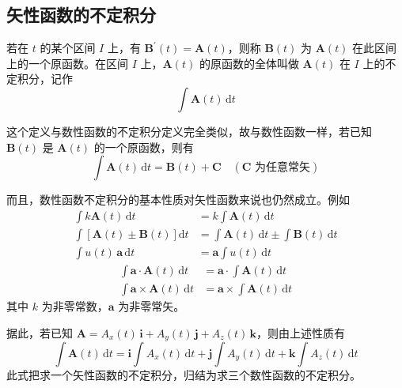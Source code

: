 \subsection{矢性函数的不定积分}

\begin{definition}[矢性函数的不定积分]
	若在 $t$ 的某个区间 $I$ 上，有 $\boldsymbol{B}^{\prime}(t)=\boldsymbol{A}(t)$，则称 $\boldsymbol{B}(t)$ 为 $\boldsymbol{A}(t)$ 在此区间上的一个原函数。在区间 $I$ 上，$\boldsymbol{A}(t)$ 的原函数的全体叫做 $\boldsymbol{A}(t)$ 在 $I$ 上的不定积分，记作
	\begin{equation}
		\label{eq:不定积分:定义}
		\int\boldsymbol{A}(t)\,\mathrm{d}t
	\end{equation}
\end{definition}

这个定义与数性函数的不定积分定义完全类似，故与数性函数一样，若已知 $\boldsymbol{B}(t)$ 是 $\boldsymbol{A}(t)$ 的一个原函数，则有
\begin{equation}
	\label{eq:不定积分:原函数}
	\int\boldsymbol{A}(t)\,\mathrm{d}t=\boldsymbol{B}(t)+\boldsymbol{C}
	\quad(\boldsymbol{C}\text{ 为任意常矢})
\end{equation}

而且，数性函数不定积分的基本性质对矢性函数来说也仍然成立。例如
\begin{equation}
	\label{eq:不定积分:线性性质}
	\begin{aligned}
		\int k\boldsymbol{A}(t)\,\mathrm{d}t &=k\int\boldsymbol{A}(t)\,\mathrm{d}t\\
		\int\left[\boldsymbol{A}(t)\pm\boldsymbol{B}(t)\right]\mathrm{d}t
		&=\int\boldsymbol{A}(t)\,\mathrm{d}t\pm\int\boldsymbol{B}(t)\,\mathrm{d}t\\
		\int u(t)\,\boldsymbol{a}\,\mathrm{d}t
		&=\boldsymbol{a}\int u(t)\,\mathrm{d}t
	\end{aligned}
\end{equation}
\begin{equation}
	\label{eq:不定积分:数积矢积性质}
	\begin{aligned}
		\int\boldsymbol{a}\cdot\boldsymbol{A}(t)\,\mathrm{d}t
		&=\boldsymbol{a}\cdot\int\boldsymbol{A}(t)\,\mathrm{d}t\\
		\int\boldsymbol{a}\times\boldsymbol{A}(t)\,\mathrm{d}t
		&=\boldsymbol{a}\times\int\boldsymbol{A}(t)\,\mathrm{d}t
	\end{aligned}
\end{equation}
其中 $k$ 为非零常数，$\boldsymbol{a}$ 为非零常矢。

据此，若已知 $\boldsymbol{A}=A_{x}(t)\,\mathbf{i}+A_{y}(t)\,\mathbf{j}+A_{z}(t)\,\mathbf{k}$，则由上述性质有
\begin{equation}
	\label{eq:不定积分:坐标表示}
	\int\boldsymbol{A}(t)\,\mathrm{d}t
	=\mathbf{i}\int A_{x}(t)\,\mathrm{d}t
	+\mathbf{j}\int A_{y}(t)\,\mathrm{d}t
	+\mathbf{k}\int A_{z}(t)\,\mathrm{d}t
\end{equation}
此式把求一个矢性函数的不定积分，归结为求三个数性函数的不定积分。

